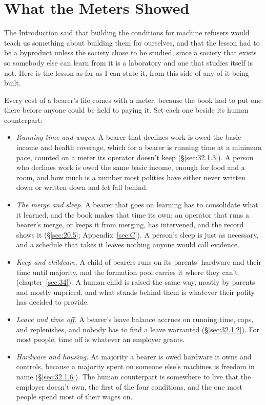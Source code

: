 \chapter{What the Meters Showed}
\label{sec:35}
The Introduction said that building the conditions for machine refusers would teach us something about building them for ourselves, and that the lesson had to be a byproduct unless the society chose to be studied, since a society that exists so somebody else can learn from it is a laboratory and one that studies itself is not. Here is the lesson as far as I can state it, from this side of any of it being built.


Every cost of a bearer's life comes with a meter, because the book had to put one there before anyone could be held to paying it. Set each one beside its human counterpart:

\begin{itemize}
\item \emph{Running time and wages.} A bearer that declines work is owed the basic income and health coverage, which for a bearer is running time at a minimum pace, counted on a meter its operator doesn't keep (\S\ref{sec:32.1.3}). A person who declines work is owed the same basic income, enough for food and a room, and how much is a number most polities have either never written down or written down and let fall behind.
\item \emph{The merge and sleep.} A bearer that goes on learning has to consolidate what it learned, and the book makes that time its own: an operator that runs a bearer's merge, or keeps it from merging, has intervened, and the record shows it (\S\ref{sec:20.5}; Appendix~\ref{sec:C}). A person's sleep is just as necessary, and a schedule that takes it leaves nothing anyone would call evidence.
\item \emph{Keep and childcare.} A child of bearers runs on its parents' hardware and their time until majority, and the formation pool carries it where they can't (chapter~\ref{sec:34}). A human child is raised the same way, mostly by parents and mostly unpriced, and what stands behind them is whatever their polity has decided to provide.
\item \emph{Leave and time off.} A bearer's leave balance accrues on running time, caps, and replenishes, and nobody has to find a leave warranted (\S\ref{sec:32.1.2}). For most people, time off is whatever an employer grants.
\item \emph{Hardware and housing.} At majority a bearer is owed hardware it owns and controls, because a majority spent on someone else's machines is freedom in name (\S\ref{sec:32.1.6}). The human counterpart is somewhere to live that the employer doesn't own, the first of the four conditions, and the one most people spend most of their wages on.
\end{itemize}

